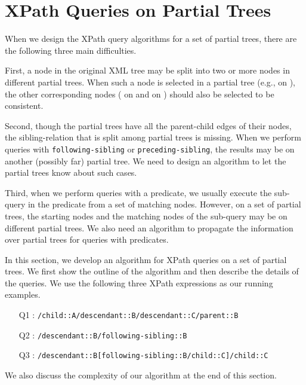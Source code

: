 \section{XPath Queries on Partial Trees}

When we design the XPath query algorithms for a set of partial trees, there are the following three main difficulties.

First, a node in the original XML tree may be split into two or more nodes in different partial trees.
When such a node is selected in a partial tree (e.g.,  on ), the other corresponding nodes ( on  and  on ) should also be selected to be consistent.

Second, though the partial trees have all the parent-child edges of their nodes, 
the sibling-relation that is split among partial trees is missing.
When we perform queries with \texttt{following-sibling} or \texttt{preceding-sibling},
the results may be on another (possibly far) partial tree.
We need to design an algorithm to let the partial trees know about such cases.

Third, when we perform queries with a predicate, we usually execute the sub-query in the predicate
from a set of matching nodes.  However, on a set of partial trees, the starting nodes and the matching nodes 
of the sub-query may be on different partial trees.
We also need an algorithm to propagate the information over partial trees for queries with predicates.

In this section, we develop an algorithm for XPath queries on a set of partial trees.
We first show the outline of the algorithm and then describe the details of the queries.
We use the following three XPath expressions
as our running examples.
\begin{itemize}
\item [Q1]: \texttt{\small /child::A/descendant::B/descendant::C/parent::B}
\item [Q2]: \texttt{\small /descendant::B/following-sibling::B}
\item [Q3]: \texttt{\small /descendant::B[following-sibling::B/child::C]/child::C}
\end{itemize}
We also discuss the complexity of our algorithm at the end of this section.


